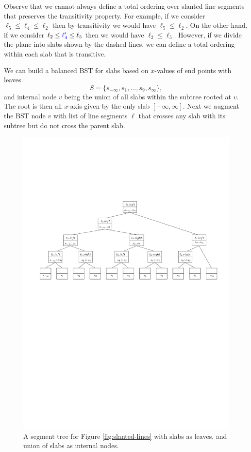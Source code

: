 Observe that we cannot always define a total ordering over slanted line segments that preserves the transitivity property. 
%
For example, if we consider $\ell_5 \leq \ell_4 \leq \ell_2$ then by transitivity we would have $\ell_5 \leq \ell_2$. 
%
On the other hand, if we consider $\ell_2 \leq \textcolor{blue}{\ell'_4} \leq \ell_5$ then we would have $\ell _2 \leq \ell_5$. 
%
However, if we divide the plane into slabs shown by the dashed lines, we can define a total ordering within each slab that is transitive. 

We can build a balanced BST for slabs based on $x$-values of end points with leaves 
\[
S = \{s_{-\infty},s_1, \dots, s_9, s_{\infty} \} ,
\] and internal node $v$ being the union of all slabs within the subtree rooted at $v$. 
%
The root is then all $x$-axis given by the only slab $[-\infty, \infty]$.
%
Next we augment the BST node $v$ with list of line segments $\ell$ that crosses any slab with its subtree but do not cross the parent slab. 

\begin{figure}[h!]
	\includegraphics[scale = .8]{ipe/seg-tree-example.pdf}
	\caption{A segment tree for Figure \ref{fig:slanted-lines} with slabs as leaves,  and union of slabs as internal nodes.}
	\label{fig:seg-tree-example}
\end{figure}
%
